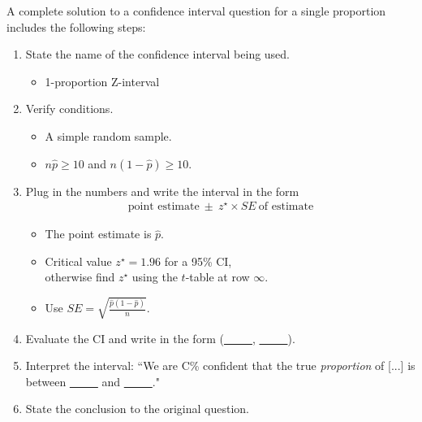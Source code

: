 \begin{termBox}{
A complete solution to a confidence interval question for a single proportion includes the following steps:
\begin{enumerate}
\setlength{\itemsep}{0mm}
\item State the name of the confidence interval being used.\vspace{-1.5mm}
\begin{itemize}
\setlength{\itemsep}{0mm}
\item 1-proportion Z-interval
\end{itemize}
\item Verify conditions.\vspace{-1.5mm}
\begin{itemize}
\setlength{\itemsep}{0mm}
\item A simple random sample.
\item $n\hat{p} \geq10$ and $n(1-\hat{p})\geq10$.
\end{itemize}
\item Plug in the numbers and write the interval in the form\vspace{-1.5mm}
\begin{align*}
\text{point estimate}\ \pm \ z^{\star} \times SE \ \text{of estimate}
\end{align*}
\begin{itemize}
\item The point estimate is $\hat{p}$.
\item Critical value $z^{\star}=1.96$ for a 95\% CI, \\
otherwise find $z^{\star}$ using the $t$-table at row $\infty$.
\item Use $SE = \sqrt{\frac{\hat{p}(1-\hat{p})}{n}}$.
\end{itemize}
\item Evaluate the CI and write in the form (\underline{\ \ \ \ \ }, \underline{\ \ \ \ \ }).
\item Interpret the interval:  ``We are C\% confident that the true \emph{proportion} of [...] is between \underline{\ \ \ \ \ } and \underline{\ \ \ \ \ }."
\item State the conclusion to the original question.
\end{enumerate}}
\end{termBox}

